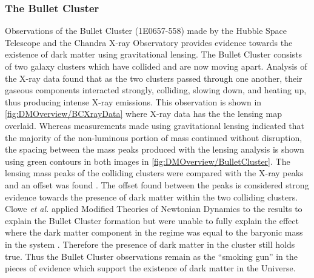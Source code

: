 \subsubsection{The Bullet Cluster}\label{sec:DMOverview/BulletCluster}
Observations of the Bullet Cluster (1E0657-558) made by the Hubble Space Telescope and the Chandra X-ray Observatory provides evidence towards the existence of dark matter using gravitational lensing.
The Bullet Cluster consists of two galaxy clusters which have collided and are now moving apart. 
Analysis of the X-ray data found that as the two clusters passed through one another, their gaseous components interacted strongly, colliding, slowing down, and heating up, thus producing intense X-ray emissions. This observation is shown in \autoref{fig:DMOverview/BCXrayData} where X-ray data has the the lensing map overlaid.  Whereas measurements made using gravitational lensing indicated that the majority of the non-luminous portion of mass continued without disruption, the spacing between the mass peaks produced with the lensing analysis is shown using green contours in both images in \autoref{fig:DMOverview/BulletCluster}. The lensing mass peaks of the colliding clusters were compared with the X-ray peaks and an offset was found \cite{Clowe_2004}. The offset found between the peaks is considered strong evidence towards the presence of dark matter within the two colliding clusters. Clowe \textit{et al.} applied Modified Theories of Newtonian Dynamics to the results to explain the Bullet Cluster formation but were unable to fully explain the effect where the dark matter component in the regime was equal to the baryonic mass in the system \cite{Clowe2006}. Therefore the presence of dark matter in the cluster still holds true. Thus the Bullet Cluster observations remain as the ``smoking gun'' in the pieces of evidence which support the existence of dark matter in the Universe.
